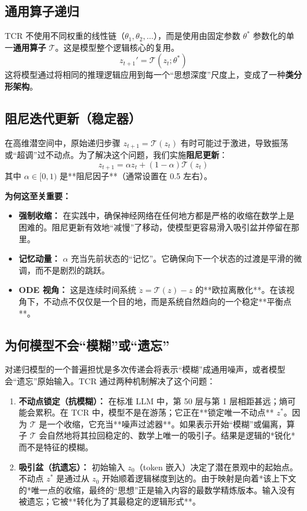 \documentclass[11pt, a4paper]{article}
\begin{document}
\subsection{通用算子递归}
TCR 不使用不同权重的线性链（$\theta_1, \theta_2, \dots$），而是使用由固定参数 $\theta^*$ 参数化的单一\textbf{通用算子} $\mathcal{T}$。这是模型整个逻辑核心的复用。
\begin{equation}
 z_{t+1}' = \mathcal{T}(z_t; \theta^*) 
\end{equation}
这将模型通过将相同的推理逻辑应用到每一个“思想深度”尺度上，变成了一种\textbf{类分形架构}。

\subsection{阻尼迭代更新（稳定器）}
在高维潜空间中，原始递归步骤 $z_{t+1} = \mathcal{T}(z_t)$ 有时可能过于激进，导致振荡或“超调”过不动点。为了解决这个问题，我们实施\textbf{阻尼更新}：
\begin{equation}
 z_{t+1} = \alpha z_t + (1 - \alpha) \mathcal{T}(z_t) 
\end{equation}
其中 $\alpha \in [0, 1)$ 是**阻尼因子**（通常设置在 0.5 左右）。

\textbf{为何这至关重要：}
\begin{itemize}
    \item \textbf{强制收缩：} 在实践中，确保神经网络在任何地方都是严格的收缩在数学上是困难的。阻尼更新有效地“减慢”了移动，使模型更容易滑入吸引盆并停留在那里。
    \item \textbf{记忆动量：} $\alpha$ 充当先前状态的“记忆”。它确保向下一个状态的过渡是平滑的微调，而不是剧烈的跳跃。
    \item \textbf{ODE 视角：} 这是连续时间系统 $\dot{z} = \mathcal{T}(z) - z$ 的**欧拉离散化**。在该视角下，不动点不仅仅是一个目的地，而是系统自然趋向的一个稳定**平衡点**。
\end{itemize}

\subsection{为何模型不会“模糊”或“遗忘”}
对递归模型的一个普遍担忧是多次传递会将表示“模糊”成通用噪声，或者模型会“遗忘”原始输入。TCR 通过两种机制解决了这个问题：

\begin{enumerate}
    \item \textbf{不动点锁定（抗模糊）：} 
    在标准 LLM 中，第 50 层与第 1 层相距甚远；熵可能会累积。在 TCR 中，模型不是在游荡；它正在**锁定唯一不动点** $z^*$。因为 $\mathcal{T}$ 是一个收缩，它充当**噪声过滤器**。如果表示开始“模糊”或偏离，算子 $\mathcal{T}$ 会自然地将其拉回稳定的、数学上唯一的吸引子。结果是逻辑的*锐化*而不是特征的模糊。

    \item \textbf{吸引盆（抗遗忘）：} 
    初始输入 $z_0$（token 嵌入）决定了潜在景观中的起始点。不动点 $z^*$ 是通过从 $z_0$ 开始顺着逻辑梯度到达的。由于映射是向着*该上下文的*唯一点的收缩，最终的“思想”正是输入内容的最数学精炼版本。输入没有被遗忘；它被**转化为了其最稳定的逻辑形式**。
\end{enumerate}
\end{document}

